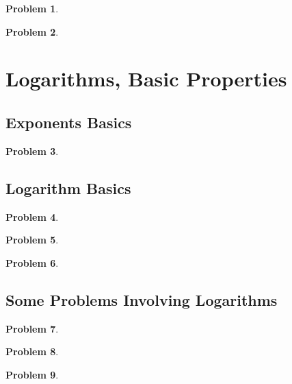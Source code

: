 \documentclass{article}
\newtheorem{problem}{Problem}
\begin{document}
\begin{problem}

\end{problem}


\begin{problem}

\end{problem}


\section{Logarithms, Basic Properties}
\subsection{Exponents Basics}
\begin{problem}

\end{problem}

\subsection{Logarithm Basics}
\begin{problem}

\end{problem}

\begin{problem}

\end{problem}

\begin{problem}

\end{problem}

\subsection{Some Problems Involving Logarithms}
\begin{problem}

\end{problem}

\begin{problem}

\end{problem}

\begin{problem}

\end{problem}
\end{document}
